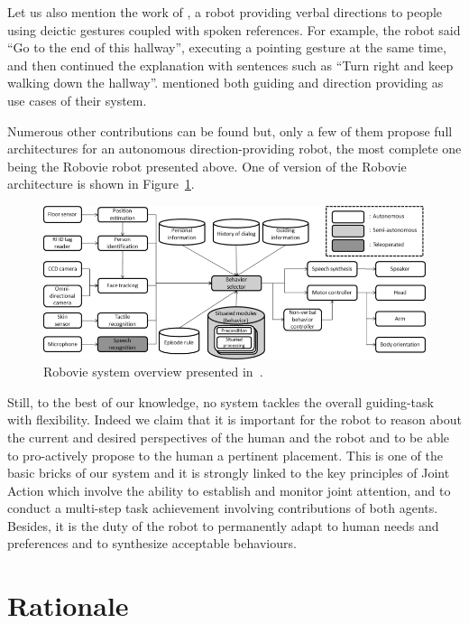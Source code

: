 \documentclass[a4paper,11pt,twoside]{StyleThese}
\begin{document}
Let us also mention the work of \cite{bohus_directions_2014}, a robot providing verbal directions to people using deictic gestures coupled with spoken references. For example, the robot said ``Go to the end of this hallway'', executing a pointing gesture at the same time, and then continued the explanation with sentences such as ``Turn right and keep walking down the hallway''. \cite{iocchi_2015_personalized} mentioned both guiding and direction providing as use cases of their system.

Numerous other contributions can be found but,  only a few of them propose full architectures for an autonomous direction-providing robot, the most complete one being the Robovie robot presented above. One of version of the Robovie architecture is shown in Figure~\ref{fig:chap3_robovie}.

\begin{figure}[!t]
	\centering
	\includegraphics[width=\textwidth]{figures/chapter3/robovie_archi.png}
	\caption{\label{fig:chap3_robovie} Robovie system overview presented in~\citep{kanda_2010_communication}.}
\end{figure}

Still, to the best of our knowledge, no system tackles the overall guiding-task with flexibility. Indeed we claim that it is important for the robot to reason about the current and desired perspectives of the human and the robot and to be able to pro-actively propose to the human a pertinent placement. This is one of the basic bricks of our system and it is strongly linked to the key principles of Joint Action which involve the ability to establish and monitor joint attention,  and to conduct a multi-step task achievement involving contributions of both agents. Besides, it is the duty of the robot to permanently adapt to human needs and preferences and to synthesize acceptable behaviours.

\section{Rationale}\label{sec:rationale}
\end{document}
